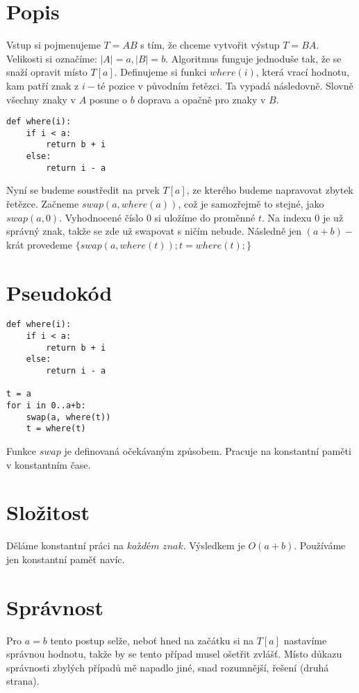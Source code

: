 \documentclass[a4paper]{article}
\begin{document}
\renewcommand{\headrulewidth}{0pt} %
\thispagestyle{fancy} %
{}

\section*{Popis}
Vstup si pojmenujeme $T = AB$ s tím, že chceme vytvořit výstup $T = BA$. Velikosti si označíme: $|A| = a, |B| = b$. Algoritmus funguje jednoduše tak, že se snaží opravit místo $T[a]$. Definujeme si funkci $where(i)$, která vrací hodnotu, kam patří znak z $i-$té pozice v původním řetězci. Ta vypadá následovně. Slovně všechny znaky v $A$ posune o $b$ doprava a opačně pro znaky v $B$.
\begin{lstlisting}
def where(i):
	if i < a:
		return b + i
	else:
		return i - a
\end{lstlisting}

Nyní se budeme soustředit na prvek $T[a]$, ze kterého budeme napravovat zbytek řetězce. Začneme $swap(a, where(a))$, což je samozřejmě to stejné, jako $swap(a, 0)$. Vyhodnocené číslo $0$ si uložíme do proměnné $t$. Na indexu $0$ je už správný znak, takže se zde už swapovat s ničím nebude. Následně jen $(a+b)-$krát provedeme $\{ swap(a, where(t)); t = where(t); \}$

\section*{Pseudokód}
\begin{lstlisting}
def where(i):
	if i < a:
		return b + i
	else:
		return i - a

t = a
for i in 0..a+b:
	swap(a, where(t))
	t = where(t)
\end{lstlisting}
Funkce $swap$ je definovaná očekávaným způsobem. Pracuje na konstantní paměti v konstantním čase.

\section*{Složitost}
Děláme konstantní práci na $\textit{každém znak}$. Výsledkem je $O(a+b)$. Používáme jen konstantní paměť navíc.

\section*{Správnost}
Pro $a=b$ tento postup selže, neboť hned na začátku si na $T[a]$ nastavíme správnou hodnotu, takže by se tento případ musel ošetřit zvlášť. Místo důkazu správnosti zbylých případů mě napadlo jiné, snad rozumnější, řešení (druhá strana).
\end{document}
